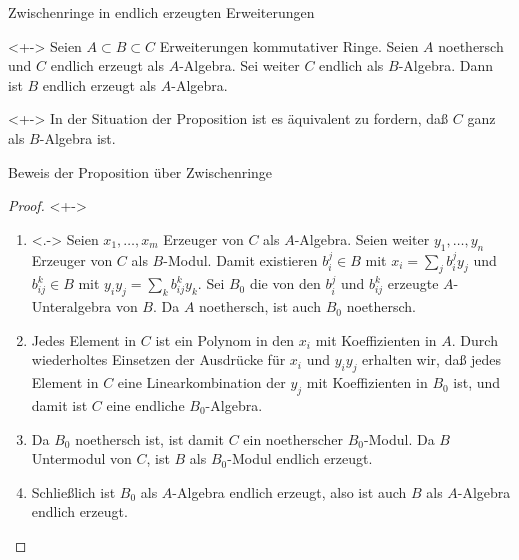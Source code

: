 \begin{frame}{Zwischenringe in endlich erzeugten Erweiterungen}
	\begin{proposition}<+->
		\label{prop:intermediate_ring}
		Seien \(A \subset B \subset C\) Erweiterungen kommutativer Ringe. Seien \(A\) noethersch
		und \(C\) endlich erzeugt als \(A\)-Algebra. Sei weiter \(C\) endlich als \(B\)-Algebra.
		Dann ist \(B\) endlich erzeugt als \(A\)-Algebra.
	\end{proposition}
	\begin{remark}<+->
		In der Situation der Proposition ist es äquivalent zu fordern, daß \(C\) ganz als \(B\)-Algebra ist.
	\end{remark}
\end{frame}

\begin{frame}{Beweis der Proposition über Zwischenringe}
	\begin{proof}<+->
		\begin{enumerate}[<+->]
		\item<.->
			Seien \(x_1, \dotsc, x_m\) Erzeuger von \(C\) als \(A\)-Algebra. Seien weiter
			\(y_1, \dotsc, y_n\) Erzeuger von \(C\) als \(B\)-Modul. Damit existieren
			\(b_i^j \in B\) mit \(x_i = \sum\limits_j b_i^j y_j\) und \(b_{ij}^k \in B\)
			mit \(y_i y_j = \sum\limits_k b_{ij}^k y_k\). Sei \(B_0\) die von den \(b_i^j\) und
			\(b_{ij}^k\) erzeugte \(A\)-Unteralgebra von \(B\). Da \(A\)
			noethersch, ist auch \(B_0\) noethersch.
		\item
			Jedes Element in \(C\) ist ein Polynom in den \(x_i\) mit Koeffizienten in \(A\).
			Durch wiederholtes Einsetzen der Ausdrücke für \(x_i\) und \(y_i y_j\) erhalten wir,
			daß jedes Element in \(C\) eine Linearkombination der \(y_j\) mit Koeffizienten
			in \(B_0\) ist, und damit ist \(C\) eine endliche \(B_0\)-Algebra.
		\item
			Da \(B_0\) noethersch ist, ist damit \(C\) ein noetherscher \(B_0\)-Modul.
			Da \(B\) Untermodul von	\(C\), ist \(B\) als \(B_0\)-Modul endlich erzeugt.
		\item
			Schließlich ist \(B_0\) als \(A\)-Algebra endlich erzeugt, also ist
			auch \(B\) als \(A\)-Algebra endlich erzeugt.
		\qedhere
		\end{enumerate}
	\end{proof}
\end{frame}

